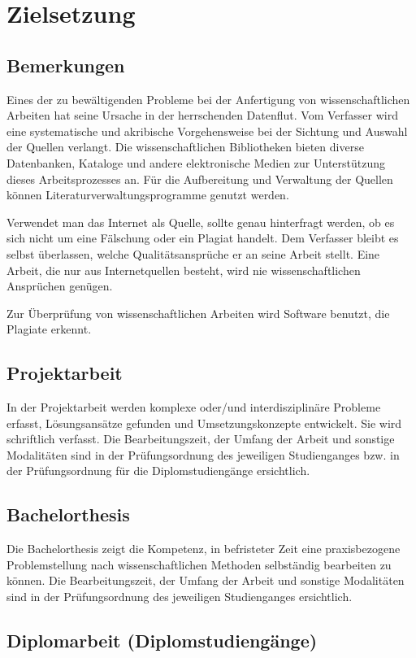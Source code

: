 \chapter{Zielsetzung}
\label{zielsetzung}
\section{Bemerkungen}
\label{zielsetzung-bemerkungen}
Eines der zu bewältigenden Probleme bei der Anfertigung von wissenschaftlichen Arbeiten hat seine Ursache in der herrschenden Datenflut.
Vom Verfasser wird eine systematische und akribische Vorgehensweise bei der Sichtung und Auswahl der Quellen verlangt.
Die wissenschaftlichen Bibliotheken bieten diverse Datenbanken, Kataloge
und andere elektronische Medien zur Unterstützung dieses Arbeitsprozesses an.
Für die Aufbereitung und Verwaltung der Quellen können Literaturverwaltungsprogramme genutzt werden.

Verwendet man das Internet als Quelle, sollte genau hinterfragt werden, ob es sich nicht um eine Fälschung oder ein Plagiat handelt.
Dem Verfasser bleibt es selbst überlassen, welche Qualitätsansprüche er an seine Arbeit stellt.
Eine Arbeit, die nur aus Internetquellen besteht, wird nie wissenschaftlichen Ansprüchen genügen. %

Zur Überprüfung von wissenschaftlichen Arbeiten wird Software benutzt, die Plagiate erkennt.


\section{Projektarbeit}
\label{zielsetzung-projektarbeit}
In der Projektarbeit werden komplexe oder/und interdisziplinäre Probleme erfasst, Lösungsansätze gefunden und Umsetzungskonzepte entwickelt.
Sie wird schriftlich verfasst.
Die Bearbeitungszeit, der Umfang der Arbeit und sonstige Modalitäten sind in der Prüfungsordnung des jeweiligen Studienganges bzw. in der Prüfungsordnung für die Diplomstudiengänge ersichtlich.

\section{Bachelorthesis}
\label{zielsetzung-bachelorthesis}
Die Bachelorthesis zeigt die Kompetenz, in befristeter Zeit eine praxisbezogene Problemstellung nach wissenschaftlichen Methoden selbständig bearbeiten zu können.
Die Bearbeitungszeit, der Umfang der Arbeit und sonstige Modalitäten sind in der Prüfungsordnung des jeweiligen Studienganges ersichtlich.

\section{Diplomarbeit (Diplomstudiengänge)}
\label{zielsetzung-diplomarbeit}
